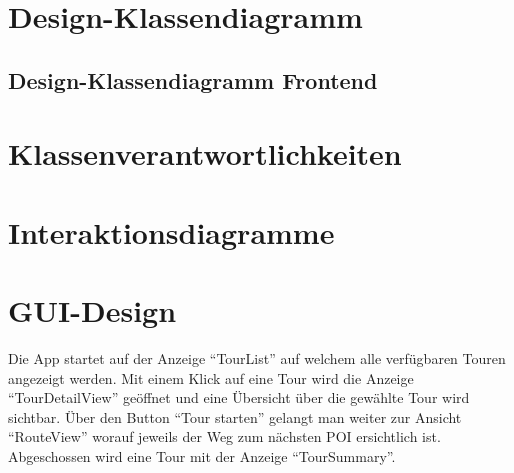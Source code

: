 \documentclass[a4paper,10pt,xetex]{article}
\begin{document}
\section{Design-Klassendiagramm}\label{design-klassendiagram}
\subsection{Design-Klassendiagramm Frontend}\label{design-klassendiagram-frontend}

\section{Klassenverantwortlichkeiten}\label{klassenverantwortlichkeiten}
\section{Interaktionsdiagramme}\label{interaktionsdiagramme}

\section{GUI-Design}\label{gui-design}
Die App startet auf der Anzeige ``TourList'' auf welchem alle verfügbaren Touren angezeigt
werden. Mit einem Klick auf eine Tour wird die Anzeige ``TourDetailView'' geöffnet und eine
Übersicht über die gewählte Tour wird sichtbar. Über den Button ``Tour starten'' gelangt
man weiter zur Ansicht ``RouteView'' worauf jeweils der Weg zum nächsten POI ersichtlich ist.
Abgeschossen wird eine Tour mit der Anzeige ``TourSummary''.

\newpage
\end{document}
